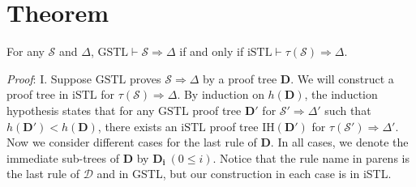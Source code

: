 \section{Theorem} For any $\mathcal{S}$ and $\Delta$, $\text{GSTL} \vdash \mathcal{S} \Rightarrow \Delta$ if and only if $\text{iSTL} \vdash \tau(\mathcal{S}) \Rightarrow \Delta$.

\textit{Proof}: I. Suppose $\text{GSTL}$ proves $\mathcal{S} \Rightarrow \Delta$ by a proof tree $\mathbf{D}$. We will construct a proof tree in $\text{iSTL}$ for $\tau(\mathcal{S}) \Rightarrow \Delta$. By induction on $h(\mathbf{D})$, the induction hypothesis states that for any $\text{GSTL}$ proof tree $\mathbf{D}'$ for $\mathcal{S}' \Rightarrow \Delta'$ such that $h(\mathbf{D}') < h(\mathbf{D})$, there exists an $\text{iSTL}$ proof tree IH$(\mathbf{D'})$ for $\tau(\mathcal{S}') \Rightarrow \Delta'$. Now we consider different cases for the last rule of $\mathbf{D}$. In all cases, we denote the immediate sub-trees of $\mathbf{D}$ by $\mathbf{D_i} ~(0 \leq i)$. Notice that the rule name in parens is the last rule of $\mathcal{D}$ and in GSTL, but our construction in each case is in iSTL.
